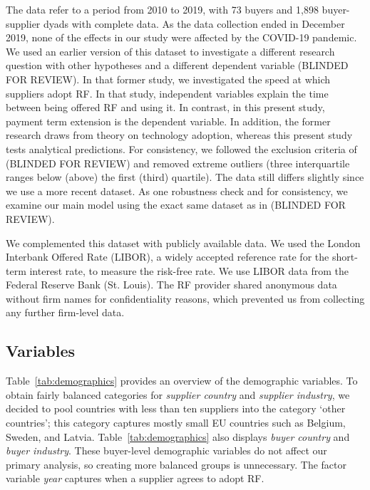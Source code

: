 \documentclass[a4paper,11pt]{article}
\renewcommand{\~}[1]{\tilde{#1}}
\renewcommand{\-}[1]{\overline{#1}}
\begin{document}
The data refer to a period from 2010 to 2019, with 73 buyers and 1,898 buyer-supplier dyads with complete data. As the data collection ended in December 2019, none of the effects in our study were affected by the COVID-19 pandemic. We used an earlier version of this dataset to investigate a different research question with other hypotheses and a different dependent variable (BLINDED FOR REVIEW). In that former study, we investigated the speed at which suppliers adopt RF. In that study, independent variables explain the time between being offered RF and using it. In contrast, in this present study, payment term extension is the dependent variable. In addition, the former research draws from theory on technology adoption, whereas this present study tests analytical predictions. For consistency, we followed the exclusion criteria of (BLINDED FOR REVIEW) and removed extreme outliers (three interquartile ranges below (above) the first (third) quartile). The data still differs slightly since we use a more recent dataset. As one robustness check and for consistency, we examine our main model using the exact same dataset as in (BLINDED FOR REVIEW).

We complemented this dataset with publicly available data. We used the London Interbank Offered Rate (LIBOR), a widely accepted reference rate for the short-term interest rate, to measure the risk-free rate. We use LIBOR data from the Federal Reserve Bank (St. Louis). The RF provider shared anonymous data without firm names for confidentiality reasons, which prevented us from collecting any further firm-level data.

\subsection{Variables}\label{sec:variables}
Table~\ref{tab:demographics} provides an overview of the demographic variables. To obtain fairly balanced categories for \textit{supplier country} and \textit{supplier industry}, we decided to pool countries with less than ten suppliers into the category `other countries'; this category captures mostly small EU countries such as Belgium, Sweden, and Latvia. Table~\ref{tab:demographics} also displays \textit{buyer country} and \textit{buyer industry}. These buyer-level demographic variables do not affect our primary analysis, so creating more balanced groups is unnecessary. The factor variable \textit{year} captures when a supplier agrees to adopt RF.
\end{document}
